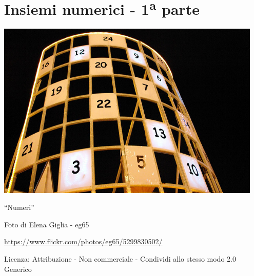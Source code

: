 \part{Insiemi numerici - 1\textsuperscript{a} parte}

\includegraphics[width=0.95\textwidth]{img/numeri.jpg}
  \begin{center}
    {\large ``Numeri''}\par
    Foto di Elena Giglia - eg65\par
    \url{https://www.flickr.com/photos/eg65/5299830502/}\par
    Licenza: Attribuzione - Non commerciale - Condividi allo stesso modo 2.0 Generico\par
  \end{center}
\clearpage
\cleardoublepage
